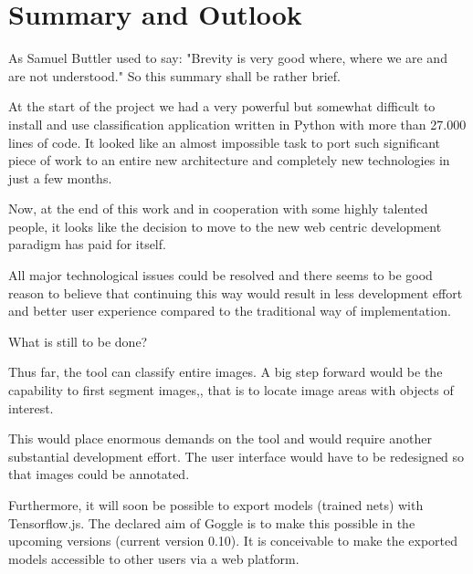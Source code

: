 \chapter{Summary and Outlook}

As Samuel Buttler used to say: "Brevity is very good where,
where we are and are not understood." So this summary shall be rather brief.

At the start of the project we had a very powerful but
somewhat difficult to install and use classification
 application written in Python with more than 27.000 lines of code. 
It looked like
an almost impossible task to port such significant piece of
work to an entire new architecture and completely new technologies in just a few months.

Now, at the end of this work and in cooperation with some 
highly talented people, it looks like the decision to
 move to the new web centric development paradigm has 
 paid for itself.

All major technological issues could be resolved and there seems to be good reason to believe that continuing this way
would result in less development effort and better user
experience compared to the traditional way of
implementation.

What is still to be done?

Thus far, the tool can classify entire images. A big step forward would be the capability to first segment images,, that is to locate image areas with objects of interest. 

This would place enormous demands on the tool and would
require another substantial development effort. The user interface would have to be redesigned so that 
images could be annotated.  

Furthermore, it will soon be possible to export models (trained nets) with Tensorflow.js. The declared aim of Goggle is to make this possible in the upcoming versions (current version 0.10). It is conceivable to make the exported models accessible to other users via a web platform. 
